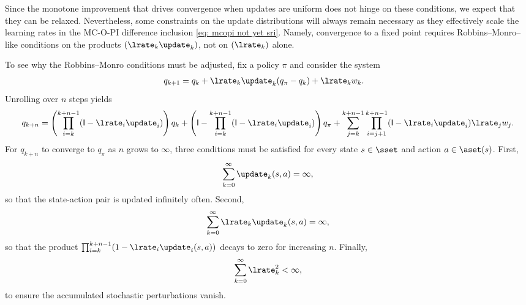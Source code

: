 
Since the monotone improvement that drives convergence when updates are uniform does not hinge on these conditions, we expect that they can be relaxed.
Nevertheless, some constraints on the update distributions will always remain necessary as they effectively scale the learning rates in the MC-O-PI difference inclusion \eqref{eq: mcopi not yet sri}.
Namely, convergence to a fixed point requires Robbins–Monro–like conditions on the products $(\lrate_k \update_k)$, not on $(\lrate_k)$ alone.


To see why the Robbins--Monro conditions must be adjusted, fix a policy $\pi$ and consider the system
\begin{align}
\label{eq: single system}
    q_{k+1}
    &= q_k + \lrate_k \update_k (q_\pi - q_k) + \lrate_k w_k .
\end{align}
Unrolling over $n$ steps yields
\begin{align*}
    q_{k+n}
    = \left( \prod_{i=k}^{k+n-1} (\mathsf{I} -\lrate_i \update_i) \right) q_k 
    + \left( \mathsf{I} - \prod_{i=k}^{k+n-1} (\mathsf{I} -\lrate_i \update_i) \right) q_\pi
    + \sum_{j=k}^{k+n-1} \prod_{i=j+1}^{k+n-1} (\mathsf{I} -\lrate_i \update_i) \lrate_j w_j .
\end{align*}
For $q_{k+n}$ to converge to $q_\pi$ as $n$ grows to $\infty$, three conditions must be satisfied for every state $s \in \sset$ and action $a \in \aset(s)$.
First,
\begin{align}
\label{eq: condition infinite visits}
    \sum_{k=0}^{\infty} \update_k(s,a) = \infty ,
\end{align}
so that the state-action pair is updated infinitely often.
Second, 
\begin{align}
    \label{eq: condition infinite effective learning rate}
    \sum_{k=0}^{\infty} \lrate_k \update_k(s,a) = \infty ,
\end{align}
so that the product $\prod_{i=k}^{k+n-1} (1 - \lrate_i \update_i(s,a))$ decays to zero for increasing $n$.
Finally,
\begin{align}
    \label{eq: summable learning rates outside def}
    \sum_{k=0}^\infty \lrate_k^2 < \infty ,
\end{align}
to ensure the accumulated stochastic perturbations vanish.

